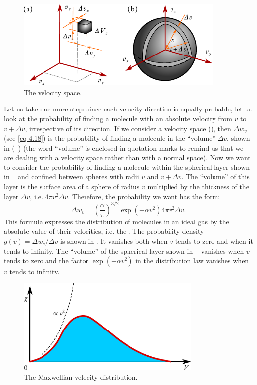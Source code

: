 	
\begin{figure}[!ht]
\centering
\includegraphics[width=0.9\textwidth]{figures/velspace.pdf}
\caption{The velocity space.\label{vel-space}}
\end{figure}
Let us take one more step: since each velocity direction is equally probable, let us look at the probability of finding a molecule with an absolute	velocity from $v$ to $v + \Delta v$,	irrespective of	its direction. If	we consider a velocity space (), then $\Delta w_{v}$ (see \eqref{eq-4.18}) is the probability of finding a molecule in the ``volume'' $\Delta v$, shown in (~) (the word ``volume'' is enclosed in quotation marks to remind us that we are dealing with a velocity space rather than with a normal space). Now we want to consider the probability of finding a molecule within the spherical layer shown in ~ and confined between spheres with radii $v$ and $v + \Delta v$. The ``volume'' of this layer is the surface area of a sphere of radius $v$ multiplied by the thickness of the layer $\Delta v$, i.e. $4 \pi v^{2} \Delta v$. Therefore, the probability we want has the form:
\begin{equation}%
\Delta w_{v}  = \left(\frac{\alpha}{\pi} \right) ^{3/2} \exp (- \alpha v^{2})  4 \pi v^{2} \Delta v.
\label{eq-4.19}
\end{equation}
This formula expresses the distribution of molecules in an ideal gas by the absolute value of their velocities, i.e. the . The probability density $g (v) = \Delta w_{v} / \Delta v$ is shown in . It vanishes both when $v$ tends to zero and when it tends to infinity. The ``volume'' of the spherical layer shown in ~ vanishes when $v$ tends to zero and the factor $\exp(- \alpha v^{2})$ in the distribution law vanishes when $v$ tends to infinity.
\begin{figure}[!ht]
\centering
\includegraphics[width=0.8\textwidth]{figures/dist2.pdf}
\caption{The Maxwellian velocity distribution.\label{mxwl-space}}
\end{figure}

